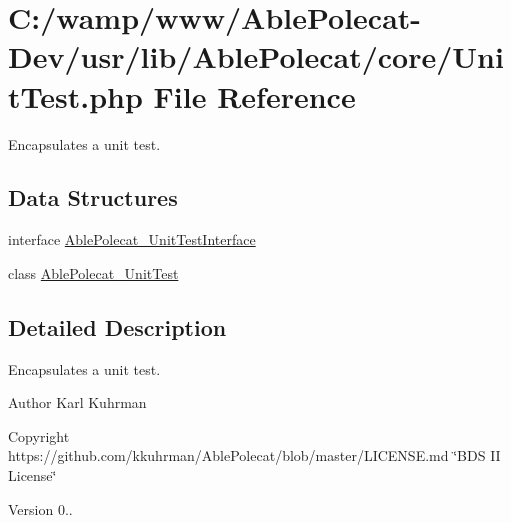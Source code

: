 \hypertarget{_unit_test_8php}{}\section{C\+:/wamp/www/\+Able\+Polecat-\/\+Dev/usr/lib/\+Able\+Polecat/core/\+Unit\+Test.php File Reference}
\label{_unit_test_8php}


Encapsulates a unit test.  


\subsection*{Data Structures}
\begin{DoxyCompactItemize}
\item 
interface \hyperlink{interface_able_polecat___unit_test_interface}{Able\+Polecat\+\_\+\+Unit\+Test\+Interface}
\item 
class \hyperlink{class_able_polecat___unit_test}{Able\+Polecat\+\_\+\+Unit\+Test}
\end{DoxyCompactItemize}


\subsection{Detailed Description}
Encapsulates a unit test. 

\begin{DoxyAuthor}{Author}
Karl Kuhrman 
\end{DoxyAuthor}
\begin{DoxyCopyright}{Copyright}
https\+://github.com/kkuhrman/\+Able\+Polecat/blob/master/\+L\+I\+C\+E\+N\+S\+E.\+md \char`\"{}\+B\+D\+S I\+I License\char`\"{} 
\end{DoxyCopyright}
\begin{DoxyVersion}{Version}
0.. 
\end{DoxyVersion}
